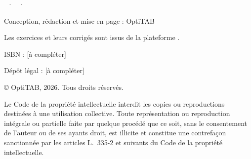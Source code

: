 \thispagestyle{empty}
\vspace*{\fill}
\begin{minipage}{110mm}
\fontsize{8.5}{11.5}\selectfont\color{otMuted}
{\otSemi\fontsize{8.5}{11}\selectfont\color{otInk}\otTitreLivre\ · \otNiveau\ · \otSousTitre}\par
\vspace{2mm}
Conception, rédaction et mise en page : OptiTAB\par
Les exercices et leurs corrigés sont issus de la plateforme \otSite.\par
\vspace{4mm}
ISBN : [à compléter]\par
Dépôt légal : [à compléter]\par
\vspace{4mm}
© OptiTAB, 2026. Tous droits réservés.\par
\vspace{4mm}
Le Code de la propriété intellectuelle interdit les copies ou reproductions
destinées à une utilisation collective. Toute représentation ou reproduction
intégrale ou partielle faite par quelque procédé que ce soit, sans le
consentement de l'auteur ou de ses ayants droit, est illicite et constitue une
contrefaçon sanctionnée par les articles L.~335-2 et suivants du Code de la
propriété intellectuelle.\par
\end{minipage}
\clearpage
